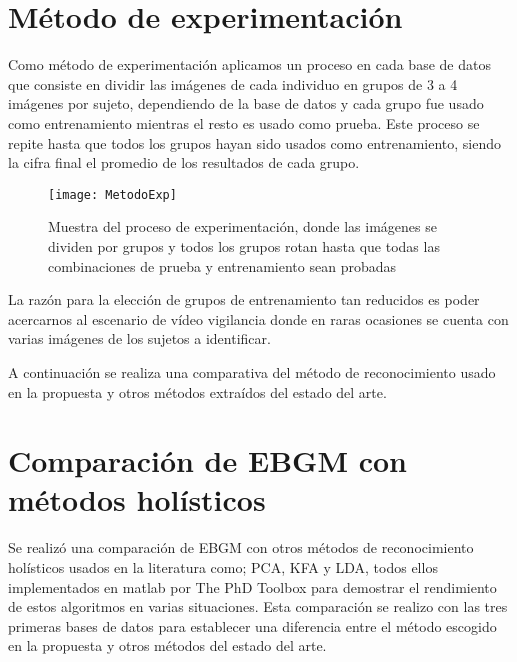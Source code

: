 \section{Método de experimentación}\label{scc:MetdoEx}
Como método de experimentación aplicamos un proceso en cada base de datos que consiste en dividir las imágenes de cada individuo en grupos de 3 a 4 imágenes por sujeto, dependiendo de la base de datos y cada grupo fue usado como entrenamiento mientras el resto es usado como prueba. Este proceso se repite hasta que todos los grupos hayan sido usados como entrenamiento, siendo la cifra final el promedio de los resultados de cada grupo.

\begin{figure}[h]
	\centering
	\texttt{[image: MetodoExp]}
    \caption{Muestra del proceso de experimentación, donde las imágenes se dividen por grupos y todos los grupos rotan hasta que todas las combinaciones de prueba y entrenamiento sean probadas}
    \label{metodo}
\end{figure}

La razón para la elección de grupos de entrenamiento tan reducidos es poder acercarnos al escenario de vídeo vigilancia donde en raras ocasiones se cuenta con varias imágenes de los sujetos a identificar.

A continuación se realiza una comparativa del método de reconocimiento usado en la propuesta y otros métodos extraídos del estado del arte.

\section{Comparación de \ac{EBGM} con métodos holísticos}\label{scc:Comparacion}
Se realizó una comparación de \ac{EBGM} con otros métodos de reconocimiento holísticos usados en la literatura como; \ac{PCA}\cite{turk1991eigenfaces}, \ac{KFA}\cite{yang2002kernel} y \ac{LDA}\cite{zhao1999subspace}, todos ellos implementados en matlab por The PhD Toolbox \cite{struc2012phd} para demostrar el rendimiento de estos algoritmos en varias situaciones. Esta comparación se realizo con las tres primeras bases de datos para establecer una diferencia entre el método escogido en la propuesta y otros métodos del estado del arte.

